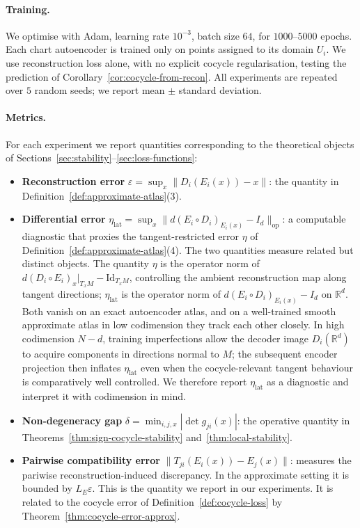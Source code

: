 \documentclass[11pt]{article}
\newcommand{\R}{\mathbb{R}}
\newcommand{\Id}{\mathrm{Id}}
\theoremstyle{plain}
\theoremstyle{definition}
\theoremstyle{remark}
\begin{document}
\paragraph{Training.}
We optimise with Adam, learning rate $10^{-3}$, batch size $64$, for $1000$--$5000$ epochs. Each chart autoencoder is trained only on points assigned to its domain $U_i$. We use reconstruction loss alone, with no explicit cocycle regularisation, testing the prediction of Corollary~\ref{cor:cocycle-from-recon}. All experiments are repeated over $5$ random seeds; we report mean $\pm$ standard deviation.

\paragraph{Metrics.}
For each experiment we report quantities corresponding to the theoretical objects of Sections~\ref{sec:stability}--\ref{sec:loss-functions}:
\begin{itemize}
    \item \textbf{Reconstruction error} $\varepsilon = \sup_x \|D_i(E_i(x)) - x\|$: the quantity in Definition~\ref{def:approximate-atlas}(3).
    \item \textbf{Differential error} $\eta_{\mathrm{lat}} = \sup_x \|d(E_i \circ D_i)_{E_i(x)} - I_d\|_{\mathrm{op}}$: a computable diagnostic that proxies the tangent-restricted error $\eta$ of Definition~\ref{def:approximate-atlas}(4). The two quantities measure related but distinct objects. The quantity $\eta$ is the operator norm of $d(D_i \circ E_i)_x|_{T_xM} - \Id_{T_xM}$, controlling the ambient reconstruction map along tangent directions; $\eta_{\mathrm{lat}}$ is the operator norm of $d(E_i \circ D_i)_{E_i(x)} - I_d$ on $\R^d$. Both vanish on an exact autoencoder atlas, and on a well-trained smooth approximate atlas in low codimension they track each other closely. In high codimension $N - d$, training imperfections allow the decoder image $D_i(\R^d)$ to acquire components in directions normal to $M$; the subsequent encoder projection then inflates $\eta_{\mathrm{lat}}$ even when the cocycle-relevant tangent behaviour is comparatively well controlled. We therefore report $\eta_{\mathrm{lat}}$ as a diagnostic and interpret it with codimension in mind.
    \item \textbf{Non-degeneracy gap} $\delta = \min_{i,j,x} |\det g_{ji}(x)|$: the operative quantity in Theorems~\ref{thm:sign-cocycle-stability} and~\ref{thm:local-stability}.

    \item \textbf{Pairwise compatibility error} $\|T_{ji}(E_i(x))-E_j(x)\|$: measures the pariwise reconstruction-induced discrepancy. In the approximate setting it is bounded by $L_E\varepsilon$. This is the quantity we report in our experiments. It is related to the cocycle error of Definition~\ref{def:cocycle-loss} by Theorem~\ref{thm:cocycle-error-approx}.
\end{itemize}
\end{document}
